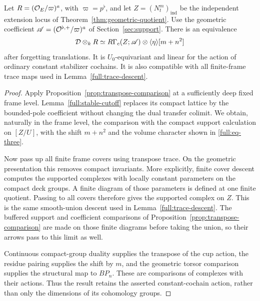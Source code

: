 \begin{proposition}
\label{prop:full-frame-comparison}
Let $R=(\mathcal O_E/\varpi)^a$, with $\varpi=p^\flat$, and let
$Z=(N_t^m)_{\mathrm{ind}}$ be the independent extension locus of
Theorem~\ref{thm:geometric-quotient}.  Use the geometric coefficient
$\mathscr A=(\mathcal O^{\flat,+}/\varpi)^a$ of
Section~\ref{sec:support}.  There is an equivalence
\begin{equation}
\label{full:eq-three}
 \mathcal D\otimes_k R
 \simeq R\Gamma_c(Z;\mathscr A)\otimes\langle\eta\rangle[m+n^2]
\end{equation}
after forgetting translations.  It is $U_0$-equivariant and linear for
the action of ordinary constant stabilizer cochains.  It is also
compatible with all finite-frame trace maps used in
Lemma~\ref{full:trace-descent}.
\end{proposition}

\begin{proof}
Apply Proposition~\ref{prop:transpose-comparison} at a sufficiently
deep fixed frame level.  Lemma~\ref{full:stable-cutoff} replaces its
compact lattice by the bounded-pole coefficient without changing the
dual transfer colimit.  We obtain, naturally in the frame level, the
comparison with the compact support calculation on $[Z/U]$, with the
shift $m+n^2$ and the volume character shown in
\eqref{full:eq-three}.

Now pass up all finite frame covers using transpose trace.  On the
geometric presentation this removes compact invariants.  More
explicitly, finite cover descent computes the supported complexes with
locally constant parameters on the compact deck groups.  A finite
diagram of those parameters is defined at one finite quotient.
Passing to all covers therefore gives the supported complex on $Z$.
This is the same smooth-union descent used in
Lemma~\ref{full:trace-descent}.  The buffered support and coefficient
comparisons of Proposition~\ref{prop:transpose-comparison} are made on
those finite diagrams before taking the union, so their arrows pass to
this limit as well.

Continuous compact-group duality supplies the transpose of the cup
action, the residue pairing supplies the shift by $m$, and the
geometric torsor comparison supplies the structural map to $BP_n$.
These are comparisons of complexes with their actions.  Thus the
result retains the asserted constant-cochain action, rather than only
the dimensions of its cohomology groups.
\end{proof}

